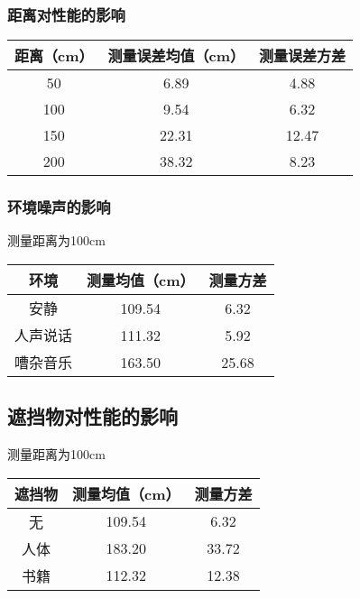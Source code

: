 \subsubsection{距离对性能的影响}
\begin{table}[h!]
    \centering
    \begin{tabular}{ccc}\toprule
        距离（cm）& 测量误差均值（cm） & 测量误差方差 \\\midrule
        \bottomrule
        50  & 6.89 & 4.88 \\
        100  & 9.54 & 6.32 \\
        150  & 22.31 & 12.47 \\
        200  & 38.32 & 8.23 \\ 
    \end{tabular}
\end{table}
\subsubsection{环境噪声的影响}
测量距离为100cm
\begin{table}[h!]
    \centering
    \begin{tabular}{ccc}\toprule
        环境& 测量均值（cm） & 测量方差 \\\midrule
        \bottomrule
        安静  & 109.54 & 6.32 \\
        人声说话  & 111.32 & 5.92 \\
        嘈杂音乐  & 163.50 & 25.68 \\
    \end{tabular}
\end{table}
\subsection{遮挡物对性能的影响}
测量距离为100cm
\begin{table}[h!]
    \centering
    \begin{tabular}{ccc}\toprule
        遮挡物& 测量均值（cm） & 测量方差 \\\midrule
        \bottomrule
        无  & 109.54 & 6.32 \\
        人体  & 183.20 & 33.72 \\
        书籍  & 112.32 & 12.38 \\
    \end{tabular}
\end{table}